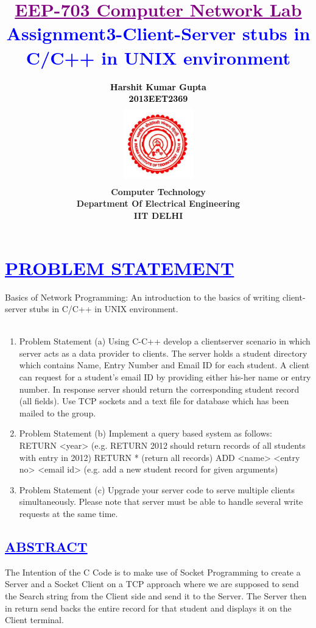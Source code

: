 \documentclass[a4paper,12pt]{report}
\title{\bfseries\huge \textcolor{purple}{\underline {EEP-703 Computer Network Lab}} \\{\textcolor{blue}{Assignment3-Client-Server stubs in C/C++ in UNIX environment}}}
\author{\bfseries\large\textcolor{black}  {Harshit Kumar Gupta}\\ {\textcolor{black} {2013EET2369 }}\\
\includegraphics[width=3cm,height=3.4cm]{./iit.png}\\\noindent Computer Technology\\
\noindent Department Of Electrical Engineering\\IIT DELHI}
\begin{document}
\maketitle
\tableofcontents


\chapter{\textcolor{blue}{\underline {PROBLEM STATEMENT}}}
\noindent 
         Basics of Network Programming: An introduction to the basics of writing client-server stubs in C/C++ in UNIX
environment.\\\\
\begin{enumerate}
 \item Problem Statement (a)
  Using C-C++ develop a client­server scenario in which server acts as a data provider to clients.
The server holds a student directory which contains Name, Entry Number and Email ID for each
student. A client can request for a student’s email ID by providing either his-her name or entry
number. In response server should return the corresponding student record (all fields). Use TCP
sockets and a text file for database which has been mailed to the group.
\item Problem Statement (b)
Implement a query based system as follows:
RETURN <year>
(e.g. RETURN 2012 should return records of all students with entry in
2012)
RETURN *
(return all records)
ADD <name> <entry no> <email id>
(e.g. add a new student record for given arguments)
\item Problem Statement (c)
Upgrade your server code to serve multiple clients simultaneously. Please note that server must
be able to handle several write requests at the same time.
\end{enumerate}

 



\begin{center}
\chapter{\textcolor{blue}{\underline {ABSTRACT}}}
\end{center}
\noindent The Intention of the C Code is to make use of Socket Programming to create a Server and a Socket Client on a TCP approach
	  where we are supposed to send the Search string from the Client side and send it to the Server.
	  The Server then in return send backs the entire record for that student and displays it on the Client terminal.
\end{document}
